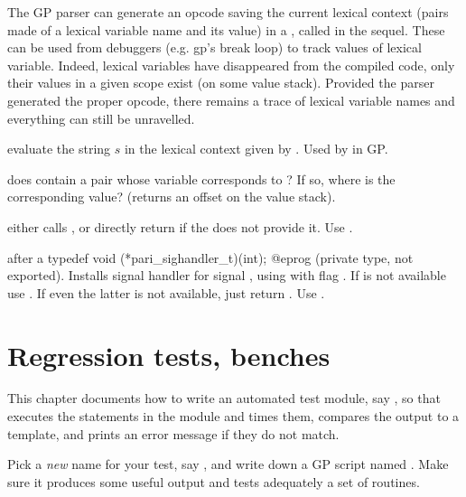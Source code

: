 
The GP parser can generate an opcode saving the current lexical context
(pairs made of a lexical variable name and its value) in a , called
 in the sequel. These can be used from debuggers (e.g. gp's break
loop) to track values of lexical variable. Indeed, lexical variables have
disappeared from the compiled code, only their values in a given scope exist
(on some value stack). Provided the parser generated the proper opcode, there
remains a trace of lexical variable names and everything can still be
unravelled.

 evaluate the string $s$
in the lexical context given by .  Used by  in GP.

 does  contain
a pair whose variable corresponds to ? If so, where is the
corresponding value? (returns an offset on the value stack).


 either calls , or directly
return  if the  does not provide it. Use .

 after a
\bprog
  typedef void (*pari_sighandler_t)(int);
@eprog\noindent
(private type, not exported). Installs signal handler  for
signal , using  with flag . If
 is not available use . If even the latter is not
available, just return . Use .

\chapter{Regression tests, benches}

This chapter documents how to write an automated test module, say ,
so that  executes the statements in the  module
and times them, compares the output to a template, and prints an error
message if they do not match.

\item Pick a \emph{new} name for your test, say , and write down a
GP script named . Make sure it produces some useful output and tests
adequately a set of routines.

